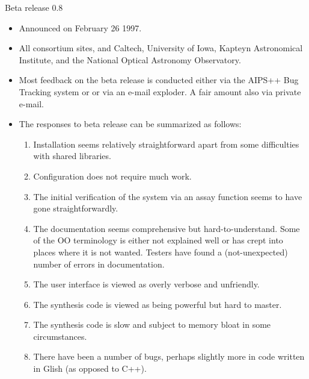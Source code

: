 \begin{slide}{Beta release 0.8}

\begin{itemize}
\item Announced on February 26 1997. 
\item All consortium sites, and Caltech, University of Iowa, Kapteyn
Astronomical Institute, and the National Optical Astronomy
Observatory. 
\item Most feedback on the beta release is conducted either via the AIPS++
Bug Tracking system or or via an e-mail exploder. A fair amount also
via private e-mail.
\item The responses to beta release can be summarized as follows:
\begin{enumerate}
\item Installation seems relatively straightforward apart from some
difficulties with shared libraries.
\item Configuration does not require much work.
\item The initial verification of the system via an assay function
seems to have gone straightforwardly.
\item The documentation seems comprehensive but hard-to-understand.
Some of the OO terminology is either not explained well or has crept
into places where it is not wanted.  Testers have found a
(not-unexpected) number of errors in documentation.
\item The user interface is viewed as overly verbose and unfriendly.
\item The synthesis code is viewed as being powerful but hard to
master.
\item The synthesis code is slow and subject to memory
bloat in some circumstances.
\item There have been a number of bugs, perhaps slightly more in code
written in Glish (as opposed to C++).
\end{enumerate}
\end{itemize}
\end{slide}

